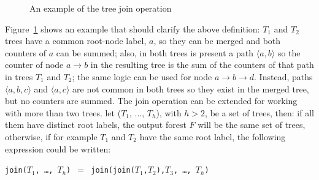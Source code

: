 \documentclass[a4paper,10pt]{report}
\begin{document}
\begin{figure}[H]

\begin{center}
\end{center}

\caption{An example of the tree join operation}
\label{join1}
\end{figure}

Figure~\ref{join1} shows an example that should clarify the above definition:
$T_1$ and $T_2$ trees have a common root-node label, $a$, so they can be merged and 
both counters of $a$ can be summed; also, in both trees is present a path $\langle a,b\rangle$ so the counter of node $a\rightarrow b$ in the resulting tree 
is the sum of the counters of that path in trees $T_1$ and $T_2$; 
the same logic can be used for node $a\rightarrow b\rightarrow d$. 
Instead, paths $\langle a, b, c\rangle$ and $\langle a, c\rangle$ are not common 
in both trees so they exist in the merged tree, but no counters are summed.
The join operation can be extended for working with more than two trees.
let ($T_1$, ..., $T_h$), with $h > 2$, be a set of trees, then:
if all them have distinct root labels, the output forest $F$ will be the same
set of trees, otherwise, if for example $T_1$ and $T_2$ have the same root label,
the following expression could be written:
\begin{center}
\texttt{join($T_1$, \dots, $T_h$) $=$ join(join($T_1$,$T_2$),$T_3$, \ldots, $T_h$)}
\end{center}
\end{document}
